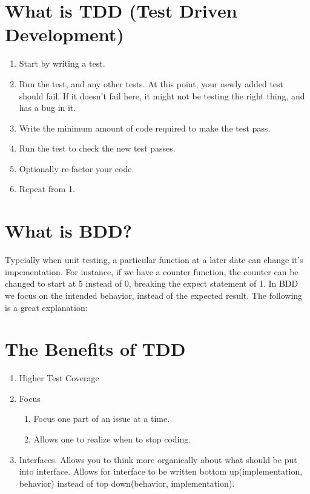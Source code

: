 \section{What is TDD (Test Driven Development)}
\begin{enumerate}
  \item Start by writing a test.
  \item Run the test, and any other tests. At this point, your newly added test
  should fail. If it doesn't fail here, it might not be testing the right thing,
  and has a bug in it.
  \item Write the minimum amount of code required to make the test pass.
  \item Run the test to check the new test passes.
  \item Optionally re-factor your code.
  \item Repeat from 1.
\end{enumerate}

\section{ What is BDD? }
Typcially when unit testing, a particular function at a later date can change
it's impementation. For instance, if we have a counter function, the counter
can be changed to start at 5 instead of 0, breaking the expect statement of 1.
In BDD we focus on the intended behavior, instead of the expected result. The
following is a great explanation:

\section{ The Benefits of TDD }
\begin{enumerate}
  \item Higher Test Coverage
  \item Focus
    \begin{enumerate}
      \item Focus one part of an issue at a time.
      \item Allows one to realize when to stop coding.
    \end{enumerate}
  \item Interfaces. Allows you to think more organically about what should be
  put into interface. Allows for interface to be written bottom
  up(implementation, behavior) instead of top down(behavior, implementation).
\end{enumerate}

